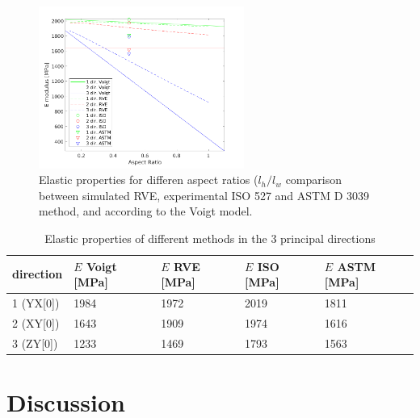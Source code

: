\begin{figure}[H]
    \centering
    \includegraphics[width=0.60\textwidth]{chapter_6_Elasticmodelling/figures/Elasticproperties.png}
    \caption{Elastic properties for differen aspect ratios ($l_h/l_w$ comparison between simulated RVE, experimental ISO 527 and ASTM D 3039 method, and according to the Voigt model.}
    \label{fig:Elasticproperties}
\end{figure}
\begin{table}
\caption{Elastic properties of different methods in the 3 principal directions}
\begin{tabular}{ p{2.2cm}p{2.2cm}p{2.2cm}p{2.2cm}p{2.2cm}}
 \hline
direction & $E$ Voigt [MPa] & $E$ RVE [MPa]& $E$ ISO [MPa]& $E$ ASTM [MPa] \\ 
\hline
1 (YX[0]) & 1984 & 1972 & 2019 & 1811 \\
2 (XY[0]) & 1643 & 1909 & 1974 & 1616 \\
3 (ZY[0]) & 1233 & 1469 & 1793 & 1563 \\
 \hline
\end{tabular}
     \label{tab:Elasticproperties}
\end{table}

\section{Discussion}

